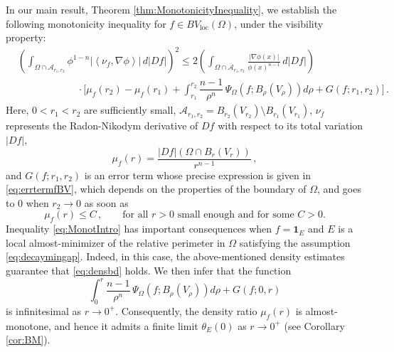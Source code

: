 \documentclass[a4paper,reqno,11pt]{amsart}
\newcommand{\loc}{\mathop{\mathrm{loc}}}
\newcommand{\ch}{\mathbf{1}}
\newcommand{\cA}{\mathcal{A}}
\newcommand{\pr}{P_{\Omega}}
\begin{document}
In our main result, Theorem \ref{thm:MonotonicityInequality}, we establish the following monotonicity inequality for $f\in BV_{\loc}(\Omega)$, under the visibility property:
\begin{align} \label{eq:MonotIntro}
	& \left( \int_{\Omega \cap \cA_{r_{1},r_{2}}} \phi^{1-n} \left|\left\langle \nu_f, \nabla \phi \right\rangle \right| \, d |Df| \right)^{2} \leq 2\left( \int_{\Omega \cap \cA_{r_{1},r_{2}}} \frac{|\nabla \phi(x)|}{\phi(x)^{n-1}}\, d |Df| \right)\nonumber \\
	& \qquad \qquad \qquad \cdot \bigg[\mu_{f}(r_{2}) - \mu_{f}(r_{1}) + \int_{r_{1}}^{r_{2}} \dfrac{n-1}{\rho^{n}} \, \Psi_{\Omega}(f;B_{\rho}(V_{\rho})) d \rho + G(f;r_1,r_{2}) \bigg] \, .
\end{align}
Here, $0<r_{1}<r_{2}$ are sufficiently small, $\cA_{r_{1},r_{2}} = B_{r_{2}}(V_{r_{2}})\setminus B_{r_{1}}(V_{r_{1}})$, $\nu_f$ represents the Radon-Nikodym derivative of $Df$ with respect to its total variation $|Df|$, 
\[
\mu_f(r) = \frac{|Df|(\Omega \cap B_r(V_r))}{r^{n-1}}\,,
\]
and $G(f;r_{1},r_{2})$ is an error term whose precise expression is given in \eqref{eq:errtermfBV}, which depends on the properties of the boundary of $\Omega$, and goes to $0$ when $r_{2}\to 0$ as soon as
\begin{equation} \label{eq:densbd}
	\mu_f(r) \leq C \, , \qquad \text{for all $r>0$ small enough and for some $C > 0$.}
\end{equation}
Inequality \eqref{eq:MonotIntro} has important consequences when $f = \ch_E$ and $E$ is a local almost-minimizer of the relative perimeter in $\Omega$ satisfying the assumption \eqref{eq:decaymingap}.
Indeed, in this case, the above-mentioned density estimates guarantee that \eqref{eq:densbd} holds. We then infer that the function
\begin{equation*}
	\int_{0}^{r} \dfrac{n-1}{\rho^{n}} \, \Psi_{\Omega}(f;B_{\rho}(V_{\rho})) d \rho + G(f;0,r)
\end{equation*}
is infinitesimal as $r \to 0^+$. Consequently, the density ratio $\mu_f(r)$ is almost-monotone, and hence it admits a finite limit $\theta_E(0)$ as $r \to 0^+$ (see Corollary \ref{cor:BM}). 
\end{document}
